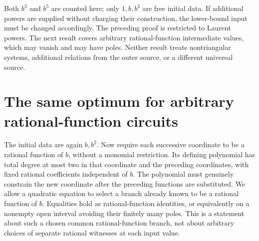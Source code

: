 \documentclass[11pt]{article}
\begin{document}
Both $b^3$ and $b^5$ are counted here; only $1,b,b^2$ are free
initial data. If additional powers are supplied without charging their
construction, the lower-bound input must be changed accordingly.
The preceding proof is restricted to Laurent powers. The next result
covers arbitrary rational-function intermediate values, which may
vanish and may have poles. Neither result treats nontriangular systems,
additional relations from the outer source, or a different universal source.

\section{The same optimum for arbitrary rational-function circuits}

The initial data are again $b,b^2$. Now require each successive
coordinate to be a rational function of $b$, without a monomial
restriction. Its defining polynomial has total degree at most two in
that coordinate and the preceding coordinates, with fixed rational
coefficients independent of $b$. The polynomial must genuinely
constrain the new coordinate after the preceding functions are
substituted. We allow a quadratic equation to select a branch already
known to be a rational function of $b$. Equalities hold as
rational-function identities, or equivalently on a nonempty open
interval avoiding their finitely many poles. This is a statement about
such a chosen common rational-function branch, not about arbitrary
choices of separate rational witnesses at each input value.
\end{document}
